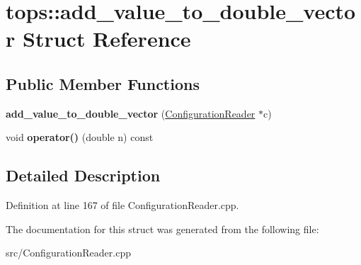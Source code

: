 \hypertarget{structtops_1_1add__value__to__double__vector}{}\section{tops\+:\+:add\+\_\+value\+\_\+to\+\_\+double\+\_\+vector Struct Reference}
\label{structtops_1_1add__value__to__double__vector}
\subsection*{Public Member Functions}
\begin{DoxyCompactItemize}
\item 
\mbox{\label{structtops_1_1add__value__to__double__vector_a63879dcddb46170bebe4905f77bd547e}} 
{\bfseries add\+\_\+value\+\_\+to\+\_\+double\+\_\+vector} (\hyperlink{classtops_1_1ConfigurationReader}{Configuration\+Reader} $\ast$c)
\item 
\mbox{\label{structtops_1_1add__value__to__double__vector_adb3cae7f29c789d97f235be133ca1c6b}} 
void {\bfseries operator()} (double n) const
\end{DoxyCompactItemize}


\subsection{Detailed Description}


Definition at line 167 of file Configuration\+Reader.\+cpp.



The documentation for this struct was generated from the following file\+:\begin{DoxyCompactItemize}
\item 
src/Configuration\+Reader.\+cpp\end{DoxyCompactItemize}
